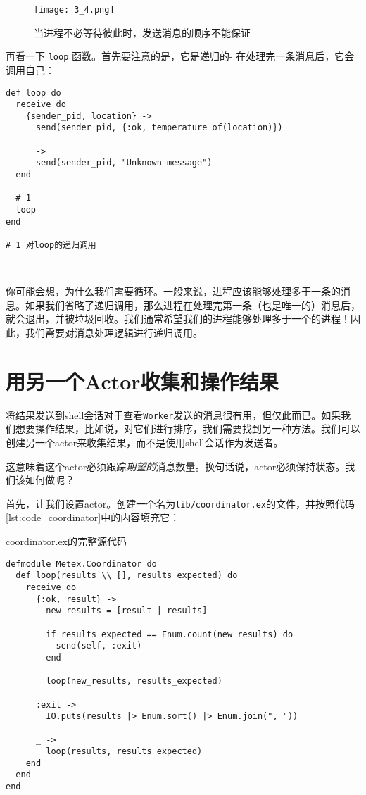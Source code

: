 \begin{figure}[!ht]
    \centering
    \texttt{[image: 3\_4.png]}
    \caption{当进程不必等待彼此时，发送消息的顺序不能保证}
    \label{fig:3_4}
\end{figure}


再看一下 \texttt{loop} 函数。首先要注意的是，它是递归的- 在处理完一条消息后，它会调用自己：

\begin{code}{}
\begin{verbatim}
def loop do
  receive do
    {sender_pid, location} ->
      send(sender_pid, {:ok, temperature_of(location)})

    _ ->
      send(sender_pid, "Unknown message")
  end

  # 1
  loop
end

# 1 对loop的递归调用
\end{verbatim}
\end{code}

\

你可能会想，为什么我们需要循环。一般来说，进程应该能够处理多于一条的消息。如果我们省略了递归调用，那么进程在处理完第一条（也是唯一的）消息后，就会退出，并被垃圾回收。我们通常希望我们的进程能够处理多于一个的进程！因此，我们需要对消息处理逻辑进行递归调用。

\section{用另一个Actor收集和操作结果}

将结果发送到shell会话对于查看\texttt{Worker}发送的消息很有用，但仅此而已。如果我们想要操作结果，比如说，对它们进行排序，我们需要找到另一种方法。我们可以创建另一个actor来收集结果，而不是使用shell会话作为发送者。

这意味着这个actor必须跟踪\emph{期望的}消息数量。换句话说，actor必须保持状态。我们该如何做呢？

首先，让我们设置actor。创建一个名为\texttt{lib/coordinator.ex}的文件，并按照代码\ref{lst:code_coordinator}中的内容填充它：

\begin{code}{coordinator.ex的完整源代码}
\begin{verbatim}
defmodule Metex.Coordinator do
  def loop(results \\ [], results_expected) do
    receive do
      {:ok, result} ->
        new_results = [result | results]

        if results_expected == Enum.count(new_results) do
          send(self, :exit)
        end

        loop(new_results, results_expected)

      :exit ->
        IO.puts(results |> Enum.sort() |> Enum.join(", "))

      _ ->
        loop(results, results_expected)
    end
  end
end
\end{verbatim}
\label{lst:code_coordinator}
\end{code}

